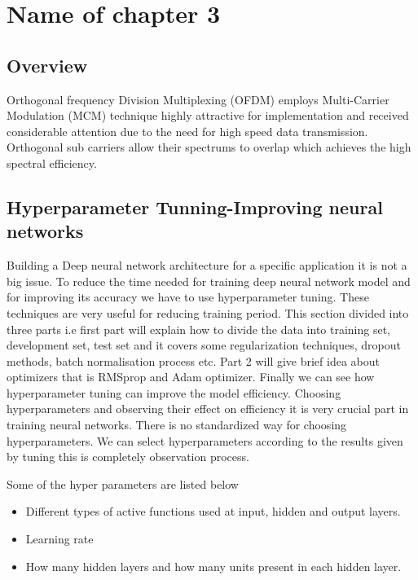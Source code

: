 \chapter{Name of chapter 3}
\setcounter{secnumdepth}{3}
\label{chap:chap3}
\section{Overview}

Orthogonal frequency Division Multiplexing (OFDM) employs Multi-Carrier Modulation (MCM) technique highly attractive for implementation and received considerable attention due to the need for high speed data transmission. Orthogonal sub carriers allow their spectrums to overlap which achieves the high spectral efficiency.



\section{Hyperparameter Tunning-Improving neural networks}
Building a Deep neural network architecture for a specific application it is not a big issue. To reduce the time needed for training deep neural network model and for improving its accuracy we have to use hyperparameter tuning. These techniques are very useful for reducing training period. This section divided into three parts i.e first part will explain how to divide the data into training set, development set, test set and it covers some regularization techniques, dropout methods, batch normalisation process etc. Part 2 will give brief idea about optimizers that is RMSprop and Adam optimizer. Finally we can see how hyperparameter tuning can improve the model efficiency. Choosing hyperparameters and observing their effect on efficiency it is very crucial part in training neural networks. There is no standardized way for choosing hyperparameters. We can select hyperparameters according to the results given by tuning this is completely observation process.\\
\par Some of the hyper parameters are listed below 
\begin{itemize}
    \item Different types of active functions used at input, hidden  and output layers. 
    \item  Learning rate 
    \item How many hidden layers and how many units present in each hidden layer.
\end{itemize}


